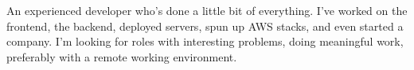 \documentclass[9pt]{developercv} %
\begin{document}
\vspace{0.5cm}



\begin{minipage}[t]{0.4\textwidth} %
	\vspace{-\baselineskip} %
        An experienced developer who's done a little bit of everything. I've worked on the frontend, the backend, deployed servers, spun up AWS stacks, and even started a company. I'm looking for roles with interesting problems, doing meaningful work, preferably with a remote working environment.

\end{minipage}
\hfill %
\begin{minipage}[t]{0.5\textwidth} %
	\vspace{-\baselineskip} %
	\begin{barchart}{5.5}
	\end{barchart}
\end{minipage}



\end{document}
